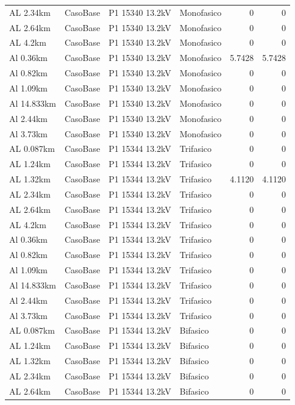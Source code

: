 \documentclass[11pt,a4paper]{article}
\begin{document}
\begin{longtable}{llllrr}
AL 2.34km & CasoBase & P1 15340 13.2kV & Monofasico & 0 & 0 \\
AL 2.64km & CasoBase & P1 15340 13.2kV & Monofasico & 0 & 0 \\
AL 4.2km & CasoBase & P1 15340 13.2kV & Monofasico & 0 & 0 \\
Al 0.36km & CasoBase & P1 15340 13.2kV & Monofasico & 5.7428 & 5.7428 \\
Al 0.82km & CasoBase & P1 15340 13.2kV & Monofasico & 0 & 0 \\
Al 1.09km & CasoBase & P1 15340 13.2kV & Monofasico & 0 & 0 \\
Al 14.833km & CasoBase & P1 15340 13.2kV & Monofasico & 0 & 0 \\
Al 2.44km & CasoBase & P1 15340 13.2kV & Monofasico & 0 & 0 \\
Al 3.73km & CasoBase & P1 15340 13.2kV & Monofasico & 0 & 0 \\
AL 0.087km & CasoBase & P1 15344 13.2kV & Trifasico & 0 & 0 \\
AL 1.24km & CasoBase & P1 15344 13.2kV & Trifasico & 0 & 0 \\
AL 1.32km & CasoBase & P1 15344 13.2kV & Trifasico & 4.1120 & 4.1120 \\
AL 2.34km & CasoBase & P1 15344 13.2kV & Trifasico & 0 & 0 \\
AL 2.64km & CasoBase & P1 15344 13.2kV & Trifasico & 0 & 0 \\
AL 4.2km & CasoBase & P1 15344 13.2kV & Trifasico & 0 & 0 \\
Al 0.36km & CasoBase & P1 15344 13.2kV & Trifasico & 0 & 0 \\
Al 0.82km & CasoBase & P1 15344 13.2kV & Trifasico & 0 & 0 \\
Al 1.09km & CasoBase & P1 15344 13.2kV & Trifasico & 0 & 0 \\
Al 14.833km & CasoBase & P1 15344 13.2kV & Trifasico & 0 & 0 \\
Al 2.44km & CasoBase & P1 15344 13.2kV & Trifasico & 0 & 0 \\
Al 3.73km & CasoBase & P1 15344 13.2kV & Trifasico & 0 & 0 \\
AL 0.087km & CasoBase & P1 15344 13.2kV & Bifasico & 0 & 0 \\
AL 1.24km & CasoBase & P1 15344 13.2kV & Bifasico & 0 & 0 \\
AL 1.32km & CasoBase & P1 15344 13.2kV & Bifasico & 0 & 0 \\
AL 2.34km & CasoBase & P1 15344 13.2kV & Bifasico & 0 & 0 \\
AL 2.64km & CasoBase & P1 15344 13.2kV & Bifasico & 0 & 0 \\

\end{longtable}
\end{document}
